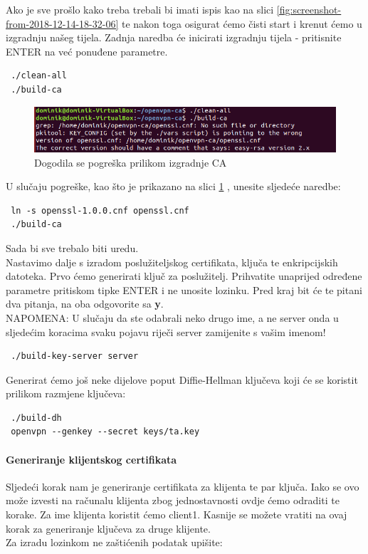 Ako je sve prošlo kako treba trebali bi imati ispis kao na slici \ref{fig:screenshot-from-2018-12-14-18-32-06} te nakon toga osigurat ćemo čisti start i krenut ćemo u izgradnju našeg tijela. Zadnja naredba će inicirati izgradnju tijela - pritisnite ENTER na već ponuđene parametre.
\begin{lstlisting}
 ./clean-all
 ./build-ca
\end{lstlisting}

\begin{figure}[h]
	\centering
	\includegraphics[width=0.7\linewidth]{"slike/OpenVPN/Screenshot from 2018-12-14 18-40-25"}
	\caption[Dogodila se pogreška prilikom izgradnje CA]{Dogodila se pogreška prilikom izgradnje CA}
	\label{fig:screenshot-from-2018-12-14-18-40-25}
\end{figure}


U slučaju pogreške, kao što je prikazano na slici \ref{fig:screenshot-from-2018-12-14-18-40-25} , unesite sljedeće naredbe:
\begin{lstlisting}
 ln -s openssl-1.0.0.cnf openssl.cnf
 ./build-ca
\end{lstlisting}
Sada bi sve trebalo biti uredu.\\

Nastavimo dalje s izradom poslužiteljskog certifikata, ključa te enkripcijskih datoteka. Prvo ćemo generirati ključ za poslužitelj. Prihvatite unaprijed određene parametre pritiskom tipke ENTER i ne unosite lozinku. Pred kraj bit će te pitani dva pitanja, na oba odgovorite sa \textbf{y}.\\
NAPOMENA: U slučaju da ste odabrali neko drugo ime, a ne server onda u sljedećim koracima svaku pojavu riječi server zamijenite s vašim imenom! 
\begin{lstlisting}
 ./build-key-server server
\end{lstlisting}
Generirat ćemo još neke dijelove poput Diffie-Hellman ključeva koji će se koristit prilikom razmjene ključeva:
\begin{lstlisting}
 ./build-dh
 openvpn --genkey --secret keys/ta.key
\end{lstlisting}

\bigbreak
\paragraph*{Generiranje klijentskog certifikata}
\hfill \smallbreak
Sljedeći korak nam je generiranje certifikata za klijenta te par ključa. Iako se ovo može izvesti na računalu klijenta zbog jednostavnosti ovdje ćemo odraditi te korake. Za ime klijenta koristit ćemo client1. Kasnije se možete vratiti na ovaj korak za generiranje ključeva za druge klijente.\\
Za izradu lozinkom ne zaštićenih podatak upišite:


